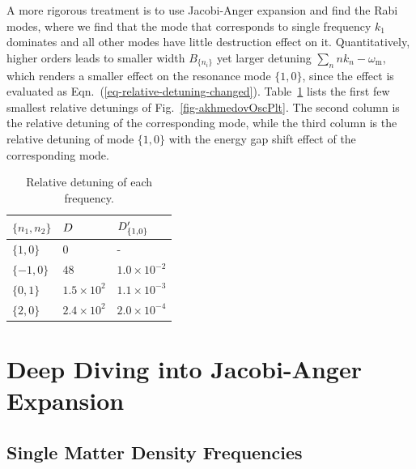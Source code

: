 A more rigorous treatment is to use Jacobi-Anger expansion and find the Rabi modes, where we find that the mode that corresponds to single frequency $k_1$ dominates and all other modes have little destruction effect on it. Quantitatively, higher orders leads to smaller width $B_{\{n_i\}}$ yet larger detuning $\sum_{n} nk_n-\omega_{\mathrm m}$, which renders a smaller effect on the resonance mode $\{1,0\}$, since the effect is evaluated as Eqn.~(\ref{eq-relative-detuning-changed}).
Table~\ref{tab-q-values-each-mode} lists the first few smallest relative detunings of Fig.~\ref{fig-akhmedovOscPlt}. The second column is the relative detuning of the corresponding mode, while the third column is the relative detuning of mode $\{1,0\}$ with the energy gap shift effect of the corresponding mode.




\begin{table}
\centering

\begin{tabular}{lll}
\hline
 $\{n_1,n_2\}$ &  $D$ & $D'_{\{1,0\}}$   \\
\hline
 $\{1,0\}$ & $0$ &  - \\
 $\{-1,0\}$ & $48$ &  $1.0\times 10^{-2}$ \\
 $\{0,1\}$ & $1.5\times 10^2$ &  $1.1\times 10^{-3}$  \\
 $\{2,0\}$ & $2.4\times 10^{2}$ & $2.0\times 10^{-4}$ \\
 \hline
\end{tabular}
\caption{\label{tab-q-values-each-mode}Relative detuning of each frequency.}
\end{table}


\section{\label{chap:matter-sec:deep-jacobi}Deep Diving into Jacobi-Anger Expansion}


\subsection{\label{chap:matter-sec:deep-jacobi-subsec:single-matter-freq}Single Matter Density Frequencies}

